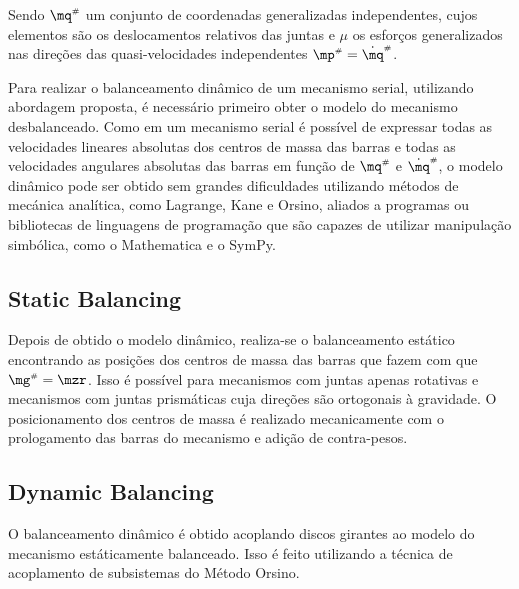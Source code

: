 \documentclass[a4paper,11pt,brazil,fleqn]{article}
\begin{document}
Sendo $\mq\ssh$ um conjunto de coordenadas generalizadas independentes, cujos elementos s\~{a}o os deslocamentos relativos das juntas e $\mu$ os esfor\c{c}os generalizados nas dire\c{c}\~oes das quasi-velocidades independentes $\mp\ssh = \dot{\mq}\ssh$.

Para realizar o balanceamento din\^{a}mico de um mecanismo serial, utilizando abordagem proposta, \'{e} necess\'{a}rio primeiro obter o modelo do mecanismo desbalanceado. Como em um mecanismo serial \'{e} poss\'{i}vel de expressar todas as velocidades lineares absolutas dos centros de massa das barras e todas as velocidades angulares absolutas das barras em fun\c{c}\~ao de $\mq\ssh$ e  $\dot{\mq}\ssh$, o modelo din\^{a}mico pode ser obtido sem grandes dificuldades utilizando m\'{e}todos de mec\'{a}nica anal\'{i}tica, como Lagrange, Kane e Orsino, aliados a programas ou bibliotecas de linguagens de programa\c{c}\~{a}o que s\~{a}o capazes de utilizar manipula\c{c}\~{a}o simb\'{o}lica, como o Mathematica e o SymPy.


\subsection{Static Balancing}\label{S02-2}

Depois de obtido o modelo din\^{a}mico, realiza-se o balanceamento est\'{a}tico encontrando as posi\c{c}\~{o}es dos centros de massa das barras que fazem com que $\mg\ssh = \mzr$. Isso \'{e} poss\'{i}vel para mecanismos com juntas apenas rotativas e mecanismos com juntas prism\'{a}ticas cuja dire\c{c}\~{o}es s\~{a}o ortogonais \`{a} gravidade. O posicionamento dos centros de massa \'e realizado mecanicamente com o prologamento das barras do mecanismo e adi\c{c}\~ao de contra-pesos.

\subsection{Dynamic Balancing}\label{S02-3}

O balanceamento din\^{a}mico \'{e} obtido acoplando discos girantes ao modelo do mecanismo est\'{a}ticamente balanceado. Isso \'{e} feito utilizando a t\'{e}cnica de acoplamento de subsistemas do M\'{e}todo Orsino.
\end{document}
